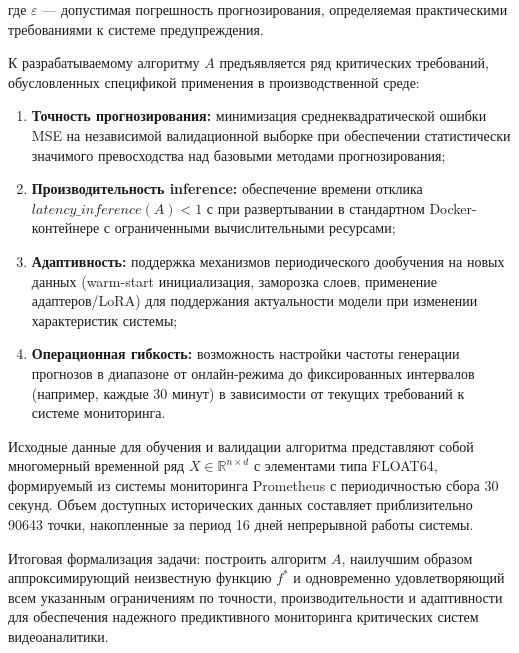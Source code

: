 где $\varepsilon$ --- допустимая погрешность прогнозирования, определяемая практическими требованиями к системе предупреждения.

\hspace*{1.25cm}К разрабатываемому алгоритму $A$ предъявляется ряд критических требований, обусловленных спецификой применения в производственной среде:

\begin{enumerate}
	\item \textbf{Точность прогнозирования:} минимизация среднеквадратической ошибки MSE на независимой валидационной выборке при обеспечении статистически значимого превосходства над базовыми методами прогнозирования;
	\item \textbf{Производительность inference:} обеспечение времени отклика \\$latency\_inference(A) < 1$ с при развертывании в стандартном Docker-контейнере с ограниченными вычислительными ресурсами;
	\item \textbf{Адаптивность:} поддержка механизмов периодического дообучения на новых данных (warm-start инициализация, заморозка слоев, применение адаптеров/LoRA) для поддержания актуальности модели при изменении характеристик системы;
	\item \textbf{Операционная гибкость:} возможность настройки частоты генерации прогнозов в диапазоне от онлайн-режима до фиксированных интервалов (например, каждые 30 минут) в зависимости от текущих требований к системе мониторинга.
\end{enumerate}

\hspace*{1.25cm}Исходные данные для обучения и валидации алгоритма представляют собой многомерный временной ряд $X \in \mathbb{R}^{n \times d}$ с элементами типа FLOAT64, формируемый из системы мониторинга Prometheus с периодичностью сбора 30 секунд. Объем доступных исторических данных составляет приблизительно 90643 точки, накопленные за период 16 дней непрерывной работы системы.

\hspace*{1.25cm}Итоговая формализация задачи: построить алгоритм $A$, наилучшим образом аппроксимирующий неизвестную функцию $f^*$ и одновременно удовлетворяющий всем указанным ограничениям по точности, производительности и адаптивности для обеспечения надежного предиктивного мониторинга критических систем видеоаналитики.

